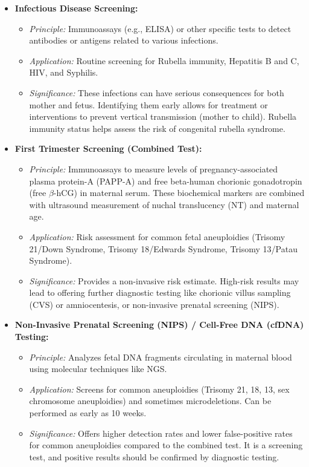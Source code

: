 \documentclass{article}
\begin{document}
\begin{itemize}
\begin{itemize}
    \end{itemize}
    \item \textbf{Infectious Disease Screening:}
    \begin{itemize}
        \item \textit{Principle:} Immunoassays (e.g., ELISA) or other specific tests to detect antibodies or antigens related to various infections.
        \item \textit{Application:} Routine screening for Rubella immunity, Hepatitis B and C, HIV, and Syphilis.
        \item \textit{Significance:} These infections can have serious consequences for both mother and fetus. Identifying them early allows for treatment or interventions to prevent vertical transmission (mother to child). Rubella immunity status helps assess the risk of congenital rubella syndrome.
    \end{itemize}
    \item \textbf{First Trimester Screening (Combined Test):}
    \begin{itemize}
        \item \textit{Principle:} Immunoassays to measure levels of pregnancy-associated plasma protein-A (PAPP-A) and free beta-human chorionic gonadotropin (free \(\beta\)-hCG) in maternal serum. These biochemical markers are combined with ultrasound measurement of nuchal translucency (NT) and maternal age.
        \item \textit{Application:} Risk assessment for common fetal aneuploidies (Trisomy 21/Down Syndrome, Trisomy 18/Edwards Syndrome, Trisomy 13/Patau Syndrome).
        \item \textit{Significance:} Provides a non-invasive risk estimate. High-risk results may lead to offering further diagnostic testing like chorionic villus sampling (CVS) or amniocentesis, or non-invasive prenatal screening (NIPS).
    \end{itemize}
    \item \textbf{Non-Invasive Prenatal Screening (NIPS) / Cell-Free DNA (cfDNA) Testing:}
    \begin{itemize}
        \item \textit{Principle:} Analyzes fetal DNA fragments circulating in maternal blood using molecular techniques like NGS.
        \item \textit{Application:} Screens for common aneuploidies (Trisomy 21, 18, 13, sex chromosome aneuploidies) and sometimes microdeletions. Can be performed as early as 10 weeks.
        \item \textit{Significance:} Offers higher detection rates and lower false-positive rates for common aneuploidies compared to the combined test. It is a screening test, and positive results should be confirmed by diagnostic testing.
    \end{itemize}
\end{itemize}
\end{document}
